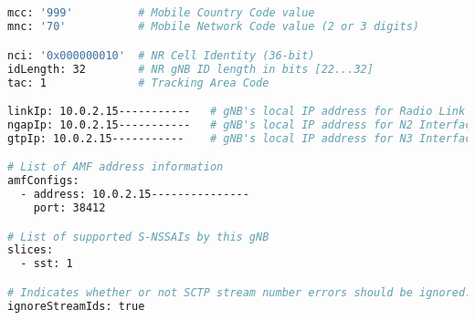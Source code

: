 \subsection{}%
\label{sec:gnb_config}%

\begin{lstlisting}[language=sh, caption=gnb configuratie]
mcc: '999'          # Mobile Country Code value
mnc: '70'           # Mobile Network Code value (2 or 3 digits)

nci: '0x000000010'  # NR Cell Identity (36-bit)
idLength: 32        # NR gNB ID length in bits [22...32]
tac: 1              # Tracking Area Code

linkIp: 10.0.2.15-----------   # gNB's local IP address for Radio Link Simulation (Usually same with local IP)
ngapIp: 10.0.2.15-----------   # gNB's local IP address for N2 Interface (Usually same with local IP)
gtpIp: 10.0.2.15-----------    # gNB's local IP address for N3 Interface (Usually same with local IP)

# List of AMF address information
amfConfigs:
  - address: 10.0.2.15---------------
    port: 38412

# List of supported S-NSSAIs by this gNB
slices:
  - sst: 1

# Indicates whether or not SCTP stream number errors should be ignored.
ignoreStreamIds: true
\end{lstlisting}

\subsection{}%
\label{sec:ue_config}%

